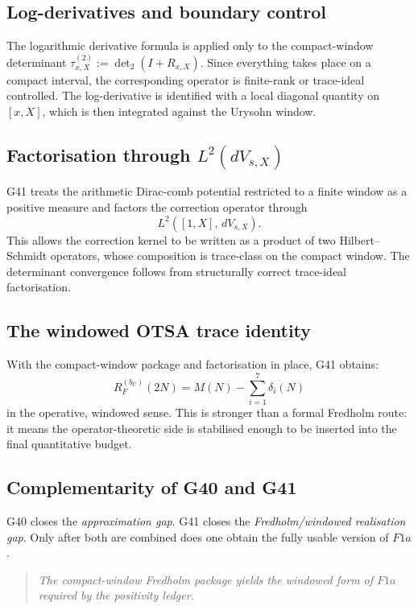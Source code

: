 \documentclass[11pt,a4paper]{article}
\begin{document}
\subsection{Log-derivatives and boundary control}

The logarithmic derivative formula is applied only to the compact-window determinant $\tau^{(2)}_{x,X}:=\det_2(I+R_{x,X})$.  Since everything takes place on a compact interval, the corresponding operator is finite-rank or trace-ideal controlled.  The log-derivative is identified with a local diagonal quantity on $[x,X]$, which is then integrated against the Urysohn window.

\subsection{Factorisation through $L^2(dV_{s,X})$}

G41 treats the arithmetic Dirac-comb potential restricted to a finite window as a positive measure and factors the correction operator through
\[
L^2([1,X],\, dV_{s,X}).
\]
This allows the correction kernel to be written as a product of two Hilbert--Schmidt operators, whose composition is trace-class on the compact window.  The determinant convergence follows from structurally correct trace-ideal factorisation.

\subsection{The windowed OTSA trace identity}

With the compact-window package and factorisation in place, G41 obtains:
\[
R_F^{(b_U)}(2N) = M(N) - \sum_{i=1}^7 \delta_i(N)
\]
in the operative, windowed sense.  This is stronger than a formal Fredholm route: it means the operator-theoretic side is stabilised enough to be inserted into the final quantitative budget.

\subsection{Complementarity of G40 and G41}

G40 closes the \emph{approximation gap}.  G41 closes the \emph{Fredholm/windowed realisation gap}.  Only after both are combined does one obtain the fully usable version of $F1a$.

\begin{quote}
\emph{The compact-window Fredholm package yields the windowed form of $F1a$ required by the positivity ledger.}
\end{quote}
\end{document}
